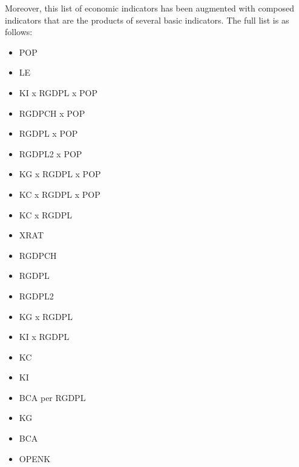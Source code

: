 Moreover, this list of economic indicators has been augmented with composed indicators that are the products of several basic indicators. The full list is as follows:
\begin{multicols}{3}
\begin{itemize}
  \item POP 
  \item LE
  \item KI x RGDPL x POP
  \item RGDPCH x POP
  \item RGDPL x POP
  \item RGDPL2 x POP
  \item KG x RGDPL x POP
  \item KC x RGDPL x POP
  \item KC x RGDPL
  \item XRAT 
  \item RGDPCH
  \item RGDPL 
  \item RGDPL2
  \item KG x RGDPL
  \item KI x RGDPL
  \item KC
  \item KI
  \item BCA per RGDPL
  \item KG
  \item BCA
  \item OPENK
\end{itemize}
\end{multicols}

